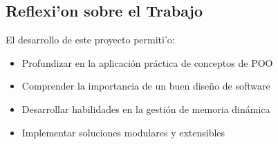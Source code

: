 \documentclass[12pt]{article}
\begin{document}
\subsection{Reflexi'on sobre el Trabajo}
El desarrollo de este proyecto permiti'o:
\begin{itemize}
    \item Profundizar en la aplicaci\'on pr\'actica de conceptos de POO
    \item Comprender la importancia de un buen dise\~no de software
    \item Desarrollar habilidades en la gesti\'on de memoria din\'amica
    \item Implementar soluciones modulares y extensibles
\end{itemize}
\end{document}
